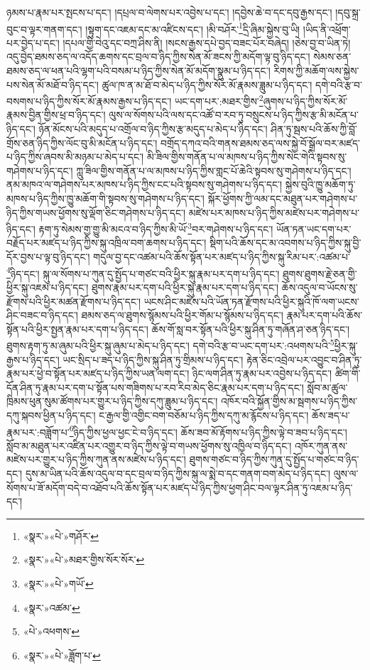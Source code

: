 ཉམས་པ་རྣམ་པར་སྤངས་པ་དང་། །དཔྲལ་བ་ལེགས་པར་འབྱེས་པ་དང་། །དབྱེས་ཆེ་བ་དང་དབུ་རྒྱས་དང་། །དབུ་སྐྲ་བུང་བ་ལྟར་གནག་དང་། །སྟུག་དང་འཇམ་དང་མ་འཛིངས་དང་། །མི་བཤོར་\footnote{«སྣར་»«པེ་»གཤོར་}དྲི་ཞིམ་སྐྱེས་བུ་ཡི། །ཡིད་ནི་འཕྲོག་པར་བྱེད་པ་དང་། །དཔལ་གྱི་བེའུ་དང་བཀྲ་ཤིས་ནི། །སངས་རྒྱས་དཔེ་བྱད་བཟང་པོར་བཞེད། །ཅེས་བྱ་བ་ཡིན་ཏེ། འདུ་བྱེད་ཐམས་ཅད་ལ་འདོད་ཆགས་དང་བྲལ་བ་ཉིད་ཀྱིས་སེན་མོ་ཟངས་ཀྱི་མདོག་ལྟ་བུ་ཉིད་དང་། སེམས་ཅན་ཐམས་ཅད་ལ་ཕན་པའི་ལྷག་པའི་བསམ་པ་ཉིད་ཀྱིས་སེན་མོ་མདོག་སྣུམ་པ་ཉིད་དང་། རིགས་ཀྱི་མཆོག་ལས་སྐྱེས་པས་སེན་མོ་མཐོ་བ་ཉིད་དང་། ཚུལ་ཁ་ན་མ་ཐོ་བ་མེད་པ་ཉིད་ཀྱིས་སོར་མོ་རྣམས་ཟླུམ་པ་ཉིད་དང་། དགེ་བའི་རྩ་བ་བསགས་པ་ཉིད་ཀྱིས་སོར་མོ་རྣམས་རྒྱས་པ་ཉིད་དང་། ཡང་དག་པར་:མཐར་གྱིས་\footnote{«སྣར་»«པེ་»མཐར་གྱིས་སོར་སོར་}ཞུགས་པ་ཉིད་ཀྱིས་སོར་མོ་རྣམས་བྱིན་གྱིས་ཕྲ་བ་ཉིད་དང་། ལུས་ལ་སོགས་པའི་ལས་དང་འཚོ་བ་རབ་ཏུ་བསྲུངས་པ་ཉིད་ཀྱིས་རྩ་མི་མངོན་པ་ཉིད་དང་། ཉོན་མོངས་པའི་མདུད་པ་འགྲོལ་བ་ཉིད་ཀྱིས་རྩ་མདུད་པ་མེད་པ་ཉིད་དང་། ཤིན་ཏུ་སྦས་པའི་ཆོས་ཀྱི་བློ་གྲོས་ཅན་ཉིད་ཀྱིས་ལོང་བུ་མི་མངོན་པ་ཉིད་དང་། བགྲོད་དཀའ་བའི་གནས་ཐམས་ཅད་ལས་སྐྱེ་བོ་སྒྲོལ་བར་མཛད་པ་ཉིད་ཀྱིས་ཞབས་མི་མཉམ་པ་མེད་པ་དང་། མི་ཟིལ་གྱིས་གནོན་པ་ལ་མཁས་པ་ཉིད་ཀྱིས་སེང་གེའི་སྟབས་སུ་གཤེགས་པ་ཉིད་དང་། ཀླུ་ཟིལ་གྱིས་གནོན་པ་ལ་མཁས་པ་ཉིད་ཀྱིས་གླང་པོ་ཆེའི་སྟབས་སུ་གཤེགས་པ་ཉིད་དང་། ནམ་མཁའ་ལ་གཤེགས་པར་མཁས་པ་ཉིད་ཀྱིས་ངང་པའི་སྟབས་སུ་གཤེགས་པ་ཉིད་དང་། སྐྱེས་བུའི་ཁྱུ་མཆོག་ཏུ་མཁས་པ་ཉིད་ཀྱིས་ཁྱུ་མཆོག་གི་སྟབས་སུ་གཤེགས་པ་ཉིད་དང་། སྐོར་ཕྱོགས་ཀྱི་ལམ་དང་མཐུན་པར་གཤེགས་པ་ཉིད་ཀྱིས་གཡས་ཕྱོགས་སུ་ལྡོག་ཅིང་གཤེགས་པ་ཉིད་དང་། མཛེས་པར་མཁས་པ་ཉིད་ཀྱིས་མཛེས་པར་གཤེགས་པ་ཉིད་དང་། རྟག་ཏུ་སེམས་གྱ་གྱུ་མི་མངའ་བ་ཉིད་ཀྱིས་མི་ཡོ་\footnote{«སྣར་»«པེ་»གཡོ་}བར་གཤེགས་པ་ཉིད་དང་། ཡོན་ཏན་ཡང་དག་པར་བརྗོད་པར་མཛད་པ་ཉིད་ཀྱིས་སྐུ་འཁྲིལ་བག་ཆགས་པ་ཉིད་དང་། སྡིག་པའི་ཆོས་དང་མ་འབགས་པ་ཉིད་ཀྱིས་སྐུ་བྱི་དོར་བྱས་པ་ལྟ་བུ་ཉིད་དང་། གདུལ་བྱ་དང་འཚམ་པའི་ཆོས་སྟོན་པར་མཛད་པ་ཉིད་ཀྱིས་སྐུ་རིམ་པར་:འཚམ་པ་\footnote{«སྣར་»འཚམ་}ཉིད་དང་། སྐུ་ལ་སོགས་པ་ཀུན་དུ་སྤྱོད་པ་གཙང་བའི་ཕྱིར་སྐུ་རྣམ་པར་དག་པ་ཉིད་དང་། ཐུགས་ཐུགས་རྗེ་ཅན་གྱི་ཕྱིར་སྐུ་འཇམ་པ་ཉིད་དང་། ཐུགས་རྣམ་པར་དག་པའི་ཕྱིར་སྐུ་རྣམ་པར་དག་པ་ཉིད་དང་། ཆོས་འདུལ་བ་ཡོངས་སུ་རྫོགས་པའི་ཕྱིར་མཚན་རྫོགས་པ་ཉིད་དང་། ཡངས་ཤིང་མཛེས་པའི་ཡོན་ཏན་རྫོགས་པའི་ཕྱིར་སྐུའི་ཁོ་ལག་ཡངས་ཤིང་བཟང་བ་ཉིད་དང་། ཐམས་ཅད་ལ་ཐུགས་སྙོམས་པའི་ཕྱིར་གོམ་པ་སྙོམས་པ་ཉིད་དང་། རྣམ་པར་དག་པའི་ཆོས་སྟོན་པའི་ཕྱིར་སྤྱན་རྣམ་པར་དག་པ་ཉིད་དང་། ཆོས་གོ་སླ་བར་སྟོན་པའི་ཕྱིར་སྐུ་ཤིན་ཏུ་གཞོན་ཤ་ཅན་ཉིད་དང་། ཐུགས་རྟག་ཏུ་མ་ཞུམ་པའི་ཕྱིར་སྐུ་ཞུམ་པ་མེད་པ་ཉིད་དང་། དགེ་བའི་རྩ་བ་ཡང་དག་པར་:འཕགས་པའི་\footnote{«པེ་»འཕགས་}ཕྱིར་སྐུ་རྒྱས་པ་ཉིད་དང་། ཡང་སྲིད་པ་ཟད་པ་ཉིད་ཀྱིས་སྐུ་ཤིན་ཏུ་གྲིམས་པ་ཉིད་དང་། རྟེན་ཅིང་འབྲེལ་པར་འབྱུང་བ་ཤིན་ཏུ་རྣམ་པར་ཕྱེ་བ་སྟོན་པར་མཛད་པ་ཉིད་ཀྱིས་ཡན་ལག་དང་། ཉིང་ལག་ཤིན་ཏུ་རྣམ་པར་འབྱེས་པ་ཉིད་དང་། ཚིག་གི་དོན་ཤིན་ཏུ་རྣམ་པར་དག་པ་སྟོན་པས་གཟིགས་པ་རབ་རིབ་མེད་ཅིང་རྣམ་པར་དག་པ་ཉིད་དང་། སློབ་མ་ཚུལ་ཁྲིམས་ཕུན་སུམ་ཚོགས་པར་གྱུར་པ་ཉིད་ཀྱིས་དཀུ་ཟླུམ་པ་ཉིད་དང་། འཁོར་བའི་སྐྱོན་གྱིས་མ་སྦགས་པ་ཉིད་ཀྱིས་དཀུ་སྐབས་ཕྱིན་པ་ཉིད་དང་། ང་རྒྱལ་གྱི་འགྱིང་བག་བཅོམ་པ་ཉིད་ཀྱིས་དཀུ་མ་རྙོངས་པ་ཉིད་དང་། ཆོས་ཟད་པ་རྣམ་པར་:བཟློག་པ་\footnote{«སྣར་»«པེ་»ཟློག་པ་}ཉིད་ཀྱིས་ཕྱལ་ཕྱང་ངེ་བ་ཉིད་དང་། ཆོས་ཟབ་མོ་རྟོགས་པ་ཉིད་ཀྱིས་ལྟེ་བ་ཟབ་པ་ཉིད་དང་། སློབ་མ་མཐུན་པར་འཛིན་པར་འགྱུར་བ་ཉིད་ཀྱིས་ལྟེ་བ་གཡས་ཕྱོགས་སུ་འཁྱིལ་བ་ཉིད་དང་། འཁོར་ཀུན་ནས་མཛེས་པར་གྱུར་པ་ཉིད་ཀྱིས་ཀུན་ནས་མཛེས་པ་ཉིད་དང་། ཐུགས་གཙང་བ་ཉིད་ཀྱིས་ཀུན་དུ་སྤྱོད་པ་གཙང་བ་ཉིད་དང་། དུས་མ་ཡིན་པའི་ཆོས་འདུལ་བ་དང་བྲལ་བ་ཉིད་ཀྱིས་སྐུ་ལ་སྨེ་བ་དང་གནག་བག་མེད་པ་ཉིད་དང་། ལུས་ལ་སོགས་པ་ཟོ་མདོག་བདེ་བ་འཐོབ་པའི་ཆོས་སྟོན་པར་མཛད་པ་ཉིད་ཀྱིས་ཕྱག་ཤིང་བལ་ལྟར་ཤིན་ཏུ་འཇམ་པ་ཉིད་དང་། 